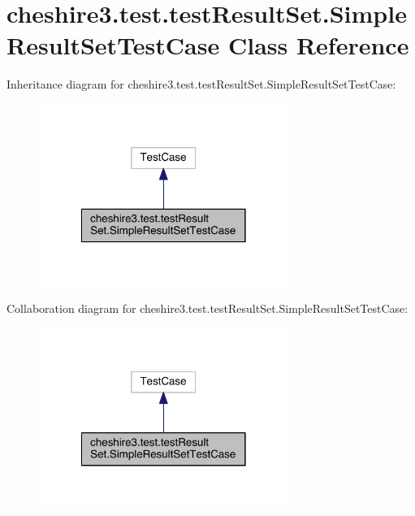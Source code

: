 \hypertarget{classcheshire3_1_1test_1_1test_result_set_1_1_simple_result_set_test_case}{\section{cheshire3.\-test.\-test\-Result\-Set.\-Simple\-Result\-Set\-Test\-Case Class Reference}
\label{classcheshire3_1_1test_1_1test_result_set_1_1_simple_result_set_test_case}
}


Inheritance diagram for cheshire3.\-test.\-test\-Result\-Set.\-Simple\-Result\-Set\-Test\-Case\-:
\nopagebreak
\begin{figure}[H]
\begin{center}
\leavevmode
\includegraphics[width=230pt]{classcheshire3_1_1test_1_1test_result_set_1_1_simple_result_set_test_case__inherit__graph}
\end{center}
\end{figure}


Collaboration diagram for cheshire3.\-test.\-test\-Result\-Set.\-Simple\-Result\-Set\-Test\-Case\-:
\nopagebreak
\begin{figure}[H]
\begin{center}
\leavevmode
\includegraphics[width=230pt]{classcheshire3_1_1test_1_1test_result_set_1_1_simple_result_set_test_case__coll__graph}
\end{center}
\end{figure}
